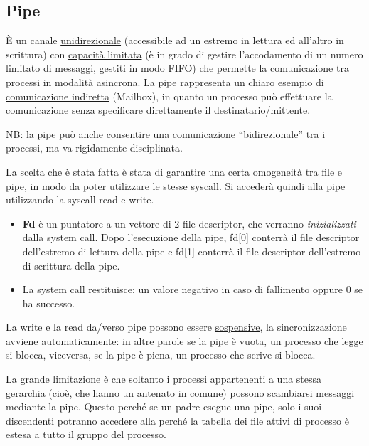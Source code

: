\documentclass{article}
\begin{document}
\subsection{Pipe}
È un canale \underline{unidirezionale} (accessibile ad
un estremo in lettura ed all'altro in scrittura) con \underline{capacità
limitata} (è in grado di gestire l'accodamento di un numero
limitato di messaggi, gestiti in modo \underline{FIFO})
che permette la comunicazione tra processi in \underline{modalità asincrona}.
La pipe rappresenta un chiaro esempio di \underline{comunicazione 
indiretta} (Mailbox), in quanto un processo può effettuare 
la comunicazione senza specificare direttamente il destinatario/mittente.

\noindent NB: la pipe può anche consentire una comunicazione “bidirezionale”
 tra i processi, ma va rigidamente disciplinata.

\noindent La scelta che è stata fatta è stata di garantire
una certa omogeneità tra file e pipe, in modo da poter
utilizzare le stesse syscall. Si accederà quindi alla pipe
utilizzando la syscall read e write.
\medskip

\noindent {} 

\begin{itemize}
    \item \textbf{Fd} è un puntatore a un vettore di 2 file 
    descriptor, che verranno \textit{inizializzati} dalla
    system call. Dopo l'esecuzione della pipe, fd[0] conterrà
    il file descriptor dell'estremo di lettura della pipe e
    fd[1] conterrà il file descriptor dell'estremo di
    scrittura della pipe.
    \item  La system call restituisce: un valore negativo
     in caso di fallimento oppure 0 se ha successo.
\end{itemize}

\noindent La write e la read
 da/verso pipe possono essere \underline{sospensive},
 la sincronizzazione avviene automaticamente: in altre parole
 se la pipe è vuota, un processo che legge si
 blocca, viceversa, se la pipe è piena, un processo che scrive
 si blocca.

 \noindent La grande limitazione è che soltanto i processi
 appartenenti a una stessa gerarchia (cioè, che hanno un antenato in comune)
 possono scambiarsi messaggi mediante la pipe. Questo perché se un
 padre esegue una pipe, solo i suoi discendenti potranno accedere alla
 perché la tabella dei file attivi di processo è estesa a
 tutto il gruppo del processo.
 \medskip
\end{document}
